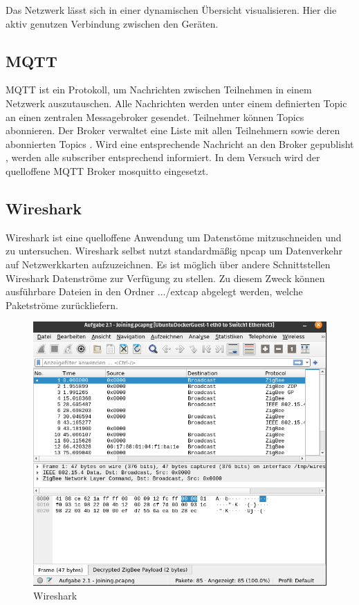 Das Netzwerk lässt sich in einer dynamischen Übersicht visualisieren. Hier die aktiv genutzen Verbindung zwischen den Geräten. 

\subsection{MQTT}

MQTT \cite{mqtt} ist ein Protokoll, um Nachrichten zwischen Teilnehmen in einem Netzwerk auszutauschen. Alle Nachrichten werden unter einem definierten \grqq Topic \grqq{} 
an einen zentralen Messagebroker gesendet. Teilnehmer können \grqq Topics \grqq{} abonnieren. Der Broker verwaltet eine Liste mit allen Teilnehmern sowie 
deren abonnierten \grqq Topics \grqq{}. Wird eine entsprechende Nachricht an den Broker \grqq gepublisht \grqq{}, werden alle \grqq subscriber \grqq{} entsprechend informiert.
In dem Versuch wird der quelloffene MQTT Broker \grqq mosquitto\grqq{} eingesetzt. 

\subsection{Wireshark}

Wireshark ist eine quelloffene Anwendung um Datenstöme mitzuschneiden und zu untersuchen. Wireshark selbst nutzt standardmäßig \grqq npcap \grqq{} um Datenverkehr 
auf Netzwerkkarten aufzuzeichnen. Es ist möglich über andere Schnittstellen Wireshark Datenströme zur Verfügung zu stellen. Zu diesem Zweck
können ausführbare Dateien in den Ordner \grqq .../extcap \grqq{} abgelegt werden, welche 
Paketströme zurückliefern. 

\begin{figure}[H]
  \centering
  \includegraphics[width=1\textwidth]{media/wireshark.png}
  \caption{Wireshark}
\end{figure}


